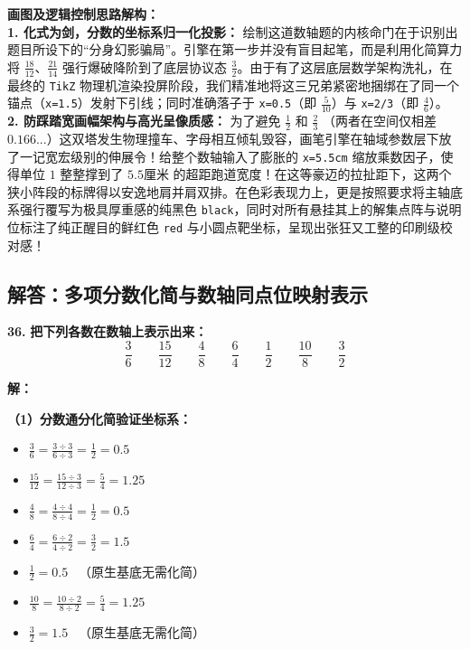 \vspace{0.4cm}
{\small\color{blue!70!black}
\textbf{画图及逻辑控制思路解构：}\\
\textbf{1. 化式为剑，分数的坐标系归一化投影：} 绘制这道数轴题的内核命门在于识别出题目所设下的“分身幻影骗局”。引擎在第一步并没有盲目起笔，而是利用化简算力将 $\frac{18}{12}、\frac{21}{14}$ 强行爆破降阶到了底层协议态 $\frac{3}{2}$。由于有了这层底层数学架构洗礼，在最终的 \texttt{TikZ} 物理机渲染投屏阶段，我们精准地将这三兄弟紧密地捆绑在了同一个锚点（\texttt{x=1.5}）发射下引线；同时准确落子于 \texttt{x=0.5}（即 $\frac{5}{10}$）与 \texttt{x=2/3}（即 $\frac{4}{6}$）。\\
\textbf{2. 防踩踏宽画幅架构与高光呈像质感：} 为了避免 $\frac{1}{2}$ 和 $\frac{2}{3}$ （两者在空间仅相差 $0.166...$）这双塔发生物理撞车、字母相互倾轧毁容，画笔引擎在轴域参数层下放了一记宽宏级别的伸展令！给整个数轴输入了膨胀的 \texttt{x=5.5cm} 缩放乘数因子，使得单位 $1$ 整整撑到了 $5.5\text{厘米}$ 的超距跑道宽度！在这等豪迈的拉扯距下，这两个狭小阵段的标牌得以安逸地肩并肩双排。在色彩表现力上，更是按照要求将主轴底系强行覆写为极具厚重感的纯黑色 \texttt{black}，同时对所有悬挂其上的解集点阵与说明位标注了纯正醒目的鲜红色 \texttt{red} 与小圆点靶坐标，呈现出张狂又工整的印刷级校对感！
}

\newpage

\newpage

\subsection{解答：多项分数化简与数轴同点位映射表示}

\vspace{0.6cm}

\textbf{\LARGE 36.} \textbf{把下列各数在数轴上表示出来：}
\[
\frac{3}{6} \qquad \frac{15}{12} \qquad \frac{4}{8} \qquad \frac{6}{4} \qquad \frac{1}{2} \qquad \frac{10}{8} \qquad \frac{3}{2}
\]

\vspace{0.4cm}
\textbf{解：}

\textbf{（1）分数通分化简验证坐标系：}
\begin{itemize}
    \item $\displaystyle \frac{3}{6} = \frac{3 \div 3}{6 \div 3} = \frac{1}{2} = 0.5$
    \item $\displaystyle \frac{15}{12} = \frac{15 \div 3}{12 \div 3} = \frac{5}{4} = 1.25$
    \item $\displaystyle \frac{4}{8} = \frac{4 \div 4}{8 \div 4} = \frac{1}{2} = 0.5$
    \item $\displaystyle \frac{6}{4} = \frac{6 \div 2}{4 \div 2} = \frac{3}{2} = 1.5$
    \item $\displaystyle \frac{1}{2} = 0.5$ \ （原生基底无需化简）
    \item $\displaystyle \frac{10}{8} = \frac{10 \div 2}{8 \div 2} = \frac{5}{4} = 1.25$
    \item $\displaystyle \frac{3}{2} = 1.5$ \ （原生基底无需化简）
\end{itemize}

